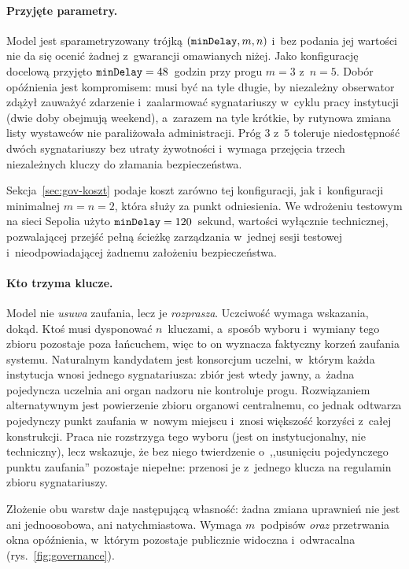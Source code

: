 \paragraph{Przyjęte parametry.} Model jest sparametryzowany trójką
$(\texttt{minDelay}, m, n)$ i~bez podania jej wartości nie da się ocenić żadnej
z~gwarancji omawianych niżej. Jako konfigurację docelową przyjęto
$\texttt{minDelay} = 48$~godzin przy progu $m=3$ z~$n=5$. Dobór opóźnienia jest
kompromisem: musi być na tyle długie, by niezależny obserwator zdążył zauważyć
zdarzenie  i~zaalarmować sygnatariuszy w~cyklu pracy
instytucji (dwie doby obejmują weekend), a~zarazem na tyle krótkie, by rutynowa
zmiana listy wystawców nie paraliżowała administracji. Próg $3$ z~$5$ toleruje
niedostępność dwóch sygnatariuszy bez utraty żywotności i~wymaga przejęcia trzech
niezależnych kluczy do złamania bezpieczeństwa.

Sekcja~\ref{sec:gov-koszt} podaje koszt zarówno tej konfiguracji, jak
i~konfiguracji minimalnej $m=n=2$, która służy za punkt odniesienia. We wdrożeniu testowym na
sieci Sepolia użyto $\texttt{minDelay} = 120$~sekund, wartości wyłącznie
technicznej, pozwalającej przejść pełną ścieżkę zarządzania w~jednej sesji
testowej i~nieodpowiadającej żadnemu założeniu bezpieczeństwa.

\paragraph{Kto trzyma klucze.} Model nie \emph{usuwa} zaufania, lecz je
\emph{rozprasza}. Uczciwość wymaga wskazania, dokąd. Ktoś musi dysponować
$n$~kluczami, a~sposób wyboru i~wymiany tego zbioru pozostaje poza łańcuchem, więc
to on wyznacza faktyczny korzeń zaufania systemu. Naturalnym kandydatem jest
konsorcjum uczelni, w~którym każda instytucja wnosi jednego sygnatariusza:
zbiór jest wtedy jawny, a~żadna pojedyncza uczelnia ani organ nadzoru nie
kontroluje progu. Rozwiązaniem alternatywnym jest powierzenie zbioru organowi
centralnemu, co jednak odtwarza pojedynczy punkt zaufania w~nowym miejscu
i~znosi większość korzyści z~całej konstrukcji. Praca nie rozstrzyga tego
wyboru (jest on instytucjonalny, nie techniczny), lecz wskazuje, że bez
niego twierdzenie o~,,usunięciu pojedynczego punktu zaufania'' pozostaje
niepełne: przenosi je z~jednego klucza na regulamin zbioru sygnatariuszy.

Złożenie obu warstw daje następującą własność: żadna zmiana uprawnień nie jest
ani jednoosobowa, ani natychmiastowa. Wymaga $m$~podpisów \emph{oraz} przetrwania
okna opóźnienia, w~którym pozostaje publicznie widoczna i~odwracalna
(rys.~\ref{fig:governance}).

